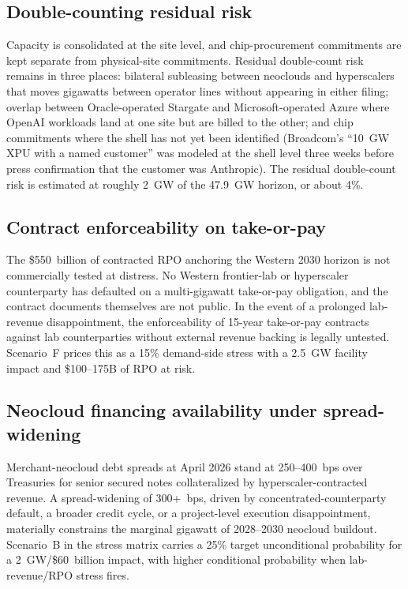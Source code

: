 \documentclass[11pt,a4paper]{article}
\begin{document}
\subsection{Double-counting residual risk}

Capacity is consolidated at the site level, and chip-procurement commitments are kept separate from physical-site commitments. Residual double-count risk remains in three places: bilateral subleasing between neoclouds and hyperscalers that moves gigawatts between operator lines without appearing in either filing; overlap between Oracle-operated Stargate and Microsoft-operated Azure where OpenAI workloads land at one site but are billed to the other; and chip commitments where the shell has not yet been identified (Broadcom's ``10~GW XPU with a named customer'' was modeled at the shell level three weeks before press confirmation that the customer was Anthropic). The residual double-count risk is estimated at roughly 2~GW of the 47.9~GW horizon, or about 4\%.

\subsection{Contract enforceability on take-or-pay}

The \$550~billion of contracted RPO anchoring the Western 2030 horizon is not commercially tested at distress. No Western frontier-lab or hyperscaler counterparty has defaulted on a multi-gigawatt take-or-pay obligation, and the contract documents themselves are not public. In the event of a prolonged lab-revenue disappointment, the enforceability of 15-year take-or-pay contracts against lab counterparties without external revenue backing is legally untested. Scenario~F prices this as a 15\% demand-side stress with a 2.5~GW facility impact and \$100--175B of RPO at risk.

\subsection{Neocloud financing availability under spread-widening}

Merchant-neocloud debt spreads at April 2026 stand at 250--400~bps over Treasuries for senior secured notes collateralized by hyperscaler-contracted revenue. A spread-widening of 300+~bps, driven by concentrated-counterparty default, a broader credit cycle, or a project-level execution disappointment, materially constrains the marginal gigawatt of 2028--2030 neocloud buildout. Scenario~B in the stress matrix carries a 25\% target unconditional probability for a 2~GW/\$60~billion impact, with higher conditional probability when lab-revenue/RPO stress fires.
\end{document}
